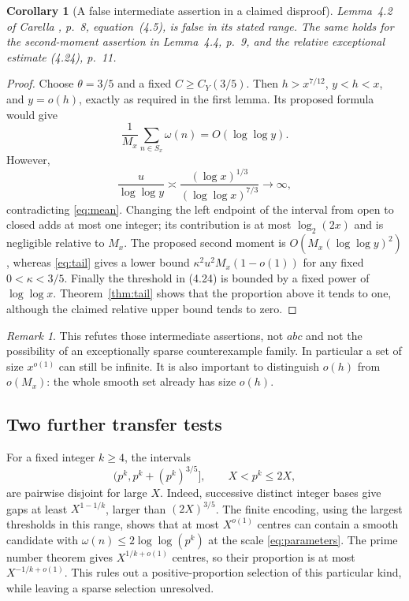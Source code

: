\documentclass[11pt]{amsart}
\newtheorem{corollary}[theorem]{Corollary}
\theoremstyle{definition}
\theoremstyle{remark}
\newtheorem{remark}[theorem]{Remark}
\newcommand{\loglog}{\log\log}
\begin{document}
\begin{corollary}[A false intermediate assertion in a claimed disproof]
\label{cor:carella}
Lemma~4.2 of Carella \cite{Carella}, p.~8, equation~(4.5), is false in its
stated range. The same holds for the second-moment assertion in
Lemma~4.4, p.~9, and the relative exceptional estimate (4.24), p.~11.
\end{corollary}
\begin{proof}
Choose $\theta=3/5$ and a fixed $C\ge C_Y(3/5)$.
Then $h>x^{7/12}$, $y<h<x$, and $y=o(h)$, exactly as required in the
first lemma. Its proposed formula would give
\[
 \frac1{M_x}\sum_{n\in S_x}\omega(n)=O(\loglog y).
\]
However,
\[
 \frac{u}{\loglog y}\asymp
 \frac{(\log x)^{1/3}}{(\loglog x)^{7/3}}\longrightarrow\infty,
\]
contradicting \eqref{eq:mean}. Changing the left endpoint of the interval
from open to closed adds at most one integer; its contribution is at most
$\log_2(2x)$ and is negligible relative to $M_x$.
The proposed second moment is $O(M_x(\loglog y)^2)$, whereas
\eqref{eq:tail} gives a lower bound
$\kappa^2u^2M_x(1-o(1))$ for any fixed $0<\kappa<3/5$.
Finally the threshold in (4.24) is bounded by a fixed power of
$\loglog x$. Theorem~\ref{thm:tail} shows that the proportion above it
tends to one, although the claimed relative upper bound tends to zero.
\end{proof}

\begin{remark}
This refutes those intermediate assertions, not $abc$ and not the possibility
of an exceptionally sparse counterexample family. In particular a set of
size $x^{o(1)}$ can still be infinite. It is also important to distinguish
$o(h)$ from $o(M_x)$: the whole smooth set already has size $o(h)$.
\end{remark}

\subsection{Two further transfer tests}
For a fixed integer $k\ge4$, the intervals
\[
 (p^k,p^k+(p^k)^{3/5}],\qquad X<p^k\le2X,
\]
are pairwise disjoint for large $X$. Indeed, successive distinct integer
bases give gaps at least $X^{1-1/k}$, larger than $(2X)^{3/5}$.
The finite encoding, using the largest thresholds in this range, shows that
at most $X^{o(1)}$ centres can contain a smooth candidate with
$\omega(n)\le2\loglog(p^k)$ at the scale \eqref{eq:parameters}.
The prime number theorem gives $X^{1/k+o(1)}$ centres, so their proportion is
at most $X^{-1/k+o(1)}$. This rules out a positive-proportion selection
of this particular kind, while leaving a sparse selection unresolved.
\end{document}
